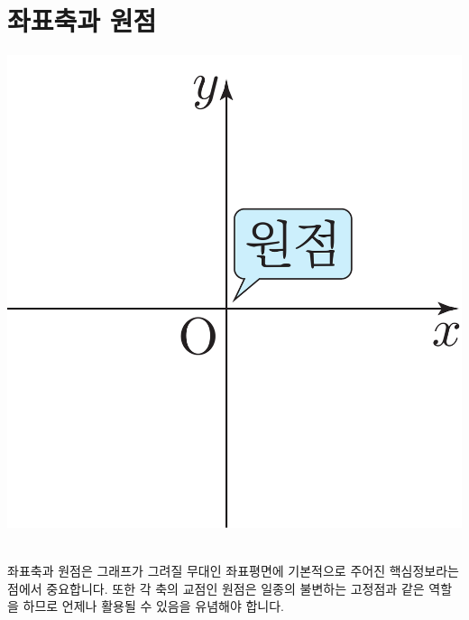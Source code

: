 \section{좌표축과 원점}
\begin{center} \includegraphics[scale=\pgfkeysvalueof{picsize}]{DBs/pic/zery_08.pdf}\
	\end{center}좌표축과 원점은 그래프가 그려질 무대인 좌표평면에 기본적으로 주어진 핵심정보라는 점에서 중요합니다. 또한 각 축의 교점인 원점은 일종의 불변하는 고정점과 같은 역할을 하므로 언제나 활용될 수 있음을 유념해야 합니다.

